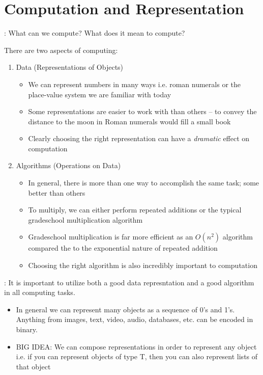 \chapter{Computation and Representation}

: What can we compute? What does it mean to compute?

\vspace*{0.5cm}

There are two aspects of computing: 
\begin{enumerate}
    \item Data (Representations of Objects)
    \begin{itemize}
        \item We can represent numbers in many ways i.e. roman numerals or the place-value system we are familiar with today
        \item Some representations are easier to work with than others -- to convey the distance to the moon in Roman numerals would fill a small book
        \item Clearly choosing the right representation can have a \emph{dramatic} effect on computation
    \end{itemize}
    \item Algorithms (Operations on Data)
    \begin{itemize}
        \item In general, there is more than one way to accomplish the same task; some better than others
        \item To multiply, we can either perform repeated additions or the typical gradeschool multiplication algorithm
        \item Gradeschool multiplication is far more efficient as an $O(n^2)$ algorithm compared the to the exponential nature of repeated addition
        \item Choosing the right algorithm is also incredibly important to computation 
    \end{itemize}
\end{enumerate}
: It is important to utilize both a good data represntation and a good algorithm in all computing tasks.

\vspace*{0.5cm}

\begin{itemize}
    \item In general we can represent many objects as a sequence of 0's and 1's. Anything from images, text, video, audio, databases, etc. can be encoded in binary.
    \item BIG IDEA: We can compose representations in order to represent any object i.e. if you can represent objects of type T, then you can also represent lists of that object
\end{itemize}

